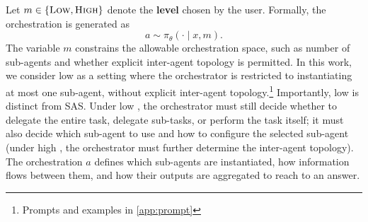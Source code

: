 Let $m \in \{\textsc{Low},\textsc{High}\}$ denote the \textbf{\masness level} chosen by the user. 
Formally, the orchestration is generated as
\begin{equation}
a \sim \pi_\theta(\cdot \mid x, m).
\end{equation}
The \masness variable $m$ constrains the allowable orchestration space, such as number of sub-agents and whether explicit inter-agent topology is permitted. {In this work, we consider low \masness as a setting where the orchestrator is restricted to instantiating at most one sub-agent, without explicit inter-agent topology.}\footnote{Prompts and examples in \cref{app:prompt}} {Importantly, low \masness is distinct from SAS. Under low \masness, the orchestrator must still decide whether to delegate the entire task, delegate sub-tasks, or perform the task itself; it must also decide which sub-agent to use and how to configure the selected sub-agent (under high \masness, the orchestrator must further determine the inter-agent topology).}
The orchestration $a$ defines which sub-agents are instantiated, how information flows between them, and how their outputs are aggregated {to reach to an answer}. 


